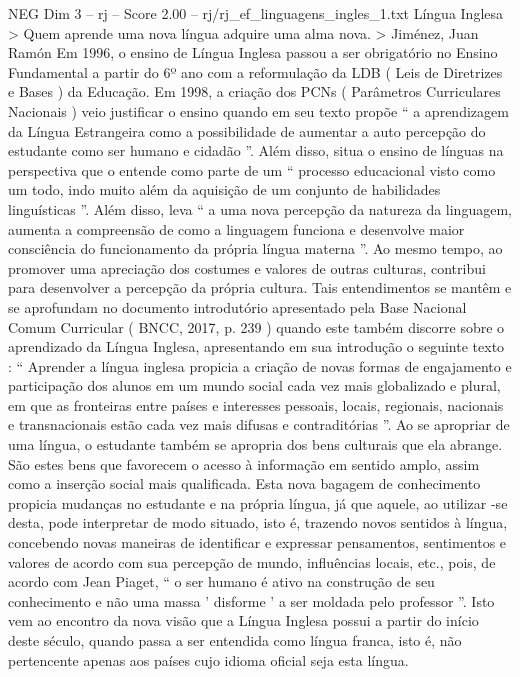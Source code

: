 \begin{textsample}{NEG Dim 3 – rj – Score 2.00 – rj/rj\_ef\_linguagens\_ingles\_1.txt}  \label{ex:f3_neg_279}
Língua Inglesa > Quem aprende uma nova língua adquire uma alma nova. > Jiménez, Juan Ramón Em 1996, o ensino de Língua Inglesa passou a ser obrigatório no Ensino Fundamental a partir do 6º ano com a reformulação da LDB ( Leis de Diretrizes e Bases ) da Educação.
Em 1998, a criação dos PCNs ( Parâmetros Curriculares Nacionais ) veio justificar o ensino quando em seu texto propõe “ a aprendizagem da Língua Estrangeira como a possibilidade de aumentar a auto percepção do estudante como ser humano e cidadão ”.
Além disso, situa o ensino de línguas na perspectiva que o entende como parte de um “ processo educacional visto como um todo, indo muito além da aquisição de um conjunto de habilidades linguísticas ”.
Além disso, leva “ a uma nova percepção da natureza da linguagem, aumenta a compreensão de como a linguagem funciona e desenvolve maior consciência do funcionamento da própria língua materna ”.
Ao mesmo tempo, ao promover uma apreciação dos costumes e valores de outras culturas, contribui para desenvolver a percepção da própria cultura.
Tais entendimentos se mantêm e se aprofundam no documento introdutório apresentado pela Base Nacional Comum Curricular ( BNCC, 2017, p. 239 ) quando este também discorre sobre o aprendizado da Língua Inglesa, apresentando em sua introdução o seguinte texto : “ Aprender a língua inglesa propicia a criação de novas formas de engajamento e participação dos alunos em um mundo social cada vez mais globalizado e plural, em que as fronteiras entre países e interesses pessoais, locais, regionais, nacionais e transnacionais estão cada vez mais difusas e contraditórias ”.
Ao se apropriar de uma língua, o estudante também se apropria dos bens culturais que ela abrange.
São estes bens que favorecem o acesso à informação em sentido amplo, assim como a inserção social mais qualificada.
Esta nova bagagem de conhecimento propicia mudanças no estudante e na própria língua, já que aquele, ao utilizar -se desta, pode interpretar de modo situado, isto é, trazendo novos sentidos à língua, concebendo novas maneiras de identificar e expressar pensamentos, sentimentos e valores de acordo com sua percepção de mundo, influências locais, etc., pois, de acordo com Jean Piaget, “ o ser humano é ativo na construção de seu conhecimento e não uma massa ' disforme ' a ser moldada pelo professor ”.
Isto vem ao encontro da nova visão que a Língua Inglesa possui a partir do início deste século, quando passa a ser entendida como língua franca, isto é, não pertencente apenas aos países cujo idioma oficial seja esta língua.

\end{textsample}
